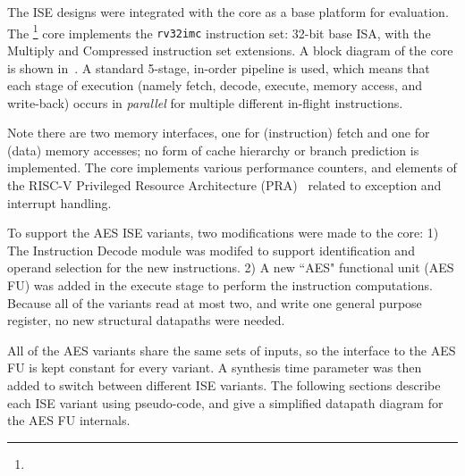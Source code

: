 

The ISE designs were integrated with the  core as a base platform
for evaluation.
The \footnote{%
} core
implements the {\tt rv32imc} instruction set: 32-bit base ISA, with the
Multiply and Compressed instruction set extensions.
A block diagram of the core is shown in~.
A standard 5-stage, in-order pipeline is used, which
means that each stage of execution
(namely fetch, decode, execute, memory access, and write-back)
occurs in {\em parallel} for multiple different in-flight instructions.

Note there are two memory interfaces, one for (instruction) fetch and one for
(data) memory accesses;
no form of cache hierarchy or branch prediction is implemented.
The core implements various performance counters,
and
elements of the
RISC-V Privileged Resource Architecture (PRA)~\cite[Chapter 3]{RV:ISA:II:17}
related to exception and interrupt handling.

To support the AES ISE variants, two modifications were made to the core:
1) The Instruction Decode module was modifed to support identification and
   operand selection for the new instructions. 
2) A new ``AES" functional unit (AES FU) was added in the execute stage to
   perform the instruction computations.
Because all of the variants read at most two,
and write one general purpose register, no new structural datapaths
were needed.

All of the AES variants share the same sets of inputs, so the interface
to the AES FU is kept constant for every variant.
A synthesis time parameter was then added to switch between different
ISE variants.
The following sections describe each ISE variant using pseudo-code, and
give a simplified datapath diagram for the AES FU internals.

